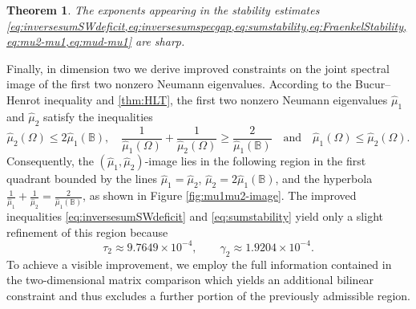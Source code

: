 \documentclass{amsart}
\numberwithin{equation}{section}
\theoremstyle{plain}
\newtheorem{theorem}{Theorem}[section]
\theoremstyle{definition}
\theoremstyle{plain}
\theoremstyle{remark}
\numberwithin{figure}{section}
\newcommand{\muu}{\widehat{\mu}}
\begin{document}
\begin{theorem}
    \label{thm:sharpness}
    The exponents appearing in the stability estimates \cref{eq:inversesumSWdeficit,eq:inversesumspecgap,eq:sumstability,eq:FraenkelStability,eq:mu2-mu1,eq:mud-mu1}     are sharp.
\end{theorem}


Finally, in dimension two we derive improved constraints on the joint spectral image of the first two nonzero Neumann eigenvalues. According to  the Bucur--Henrot inequality \cite{BH19} and  \cref{thm:HLT},  the first two nonzero Neumann eigenvalues
 $\muu_1$ and $\muu_2$ satisfy the inequalities 
\[
  \muu_2(\Omega) \le 2\muu_1(\mathbb B), \quad \frac{1}{\muu_1(\Omega)}+\frac{1}{\muu_2(\Omega)} \ge \frac{2}{\muu_1(\mathbb B)} \quad \text{and} \quad \muu_1(\Omega) \le \muu_2(\Omega).
\]
Consequently, the  $(\muu_1,\muu_2)$-image lies in the following region in the first quadrant bounded by the lines $\muu_1=\muu_2$, $\muu_2=2\muu_1(\mathbb B)$, and the hyperbola $\frac{1}{\muu_1}+\frac{1}{\muu_2}= \frac{2}{\muu_1(\mathbb B)}$, as shown in Figure \ref{fig:mu1mu2-image}. The improved inequalities \cref{eq:inversesumSWdeficit} and \cref{eq:sumstability} yield only a slight refinement of this region because 
\[\tau_2\approx9.7649\times10^{-4},\qquad   \gamma_2\approx1.9204\times10^{-4}.\]
To achieve a visible improvement, we employ the full information contained in the two-dimensional matrix  comparison which yields an additional bilinear constraint and thus excludes a further portion of the previously admissible region.
\end{document}
